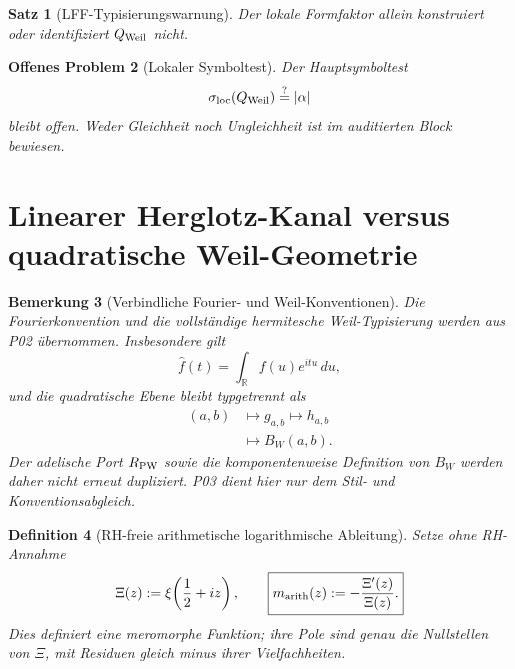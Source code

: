 \documentclass[11pt,a4paper]{amsart}
\newtheorem{theorem}{Satz}[section]
\newtheorem{definition}[theorem]{Definition}
\newtheorem{remark}[theorem]{Bemerkung}
\newtheorem{openproblem}[theorem]{Offenes Problem}
\begin{document}
\begin{theorem}[LFF-Typisierungswarnung]\label{thm:lff-firewall}
Der lokale Formfaktor allein konstruiert oder identifiziert
$Q_{\rm Weil}$ nicht.
\end{theorem}

\begin{openproblem}[Lokaler Symboltest]\label{op:symbol-test}
Der Hauptsymboltest
\[
  \sigma_{\rm loc}(Q_{\rm Weil})\stackrel{?}{=}|\alpha|
\]
bleibt offen. Weder Gleichheit noch Ungleichheit ist im auditierten Block
bewiesen.
\end{openproblem}

\section{Linearer Herglotz-Kanal versus quadratische Weil-Geometrie}

\begin{remark}[Verbindliche Fourier- und Weil-Konventionen]
\label{rem:p02-conventions}
Die Fourierkonvention und die vollständige hermitesche Weil-Typisierung werden
aus P02 übernommen. Insbesondere gilt
\[
  \widehat f(t)=\int_{\mathbb R}f(u)e^{itu}\,du,
\]
und die quadratische Ebene bleibt typgetrennt als
\[
\begin{aligned}
  (a,b)&\longmapsto g_{a,b}\longmapsto h_{a,b}\\
       &\longmapsto B_W(a,b).
\end{aligned}
\]
Der adelische Port $R_{\rm PW}$ sowie die komponentenweise Definition von
$B_W$ werden daher nicht erneut dupliziert. P03 dient hier nur dem
Stil- und Konventionsabgleich.
\end{remark}

\begin{definition}[RH-freie arithmetische logarithmische Ableitung]
\label{def:m-arith}
Setze ohne RH-Annahme
\[
  \Xi(z):=\xi\!\left(\frac12+iz\right),
  \qquad
  \boxed{m_{\rm arith}(z):=-\frac{\Xi'(z)}{\Xi(z)}.}
\]
Dies definiert eine meromorphe Funktion; ihre Pole sind genau die Nullstellen
von $\Xi$, mit Residuen gleich minus ihrer Vielfachheiten.
\end{definition}
\end{document}
